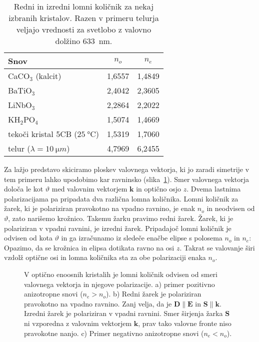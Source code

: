 \begin{table}[h]
 \centering
\begin{tabular}{|l|c|c|} \hline  
      Snov & $n_o$ & $n_e$ \\ \hline
      CaCO$_3$ (kalcit) & 1,6557 & 1,4849 \\ \hline
      BaTiO$_3$ & 2,4042 & 2,3605 \\ \hline
      LiNbO$_3$ & 2,2864 & 2,2022 \\ \hline
      KH$_2$PO$_4$ & 1,5074 & 1,4669 \\ \hline
      tekoči kristal 5CB ($25~\si{\degreeCelsius}$) & 1,5319 & 1,7060 \\ \hline
      telur ($\lambda = 10~\si{\micro m}$) & 4,7969 & 6,2455 \\
\hline 
\end{tabular}
  \caption{Redni in izredni lomni količnik za nekaj izbranih kristalov. Razen v primeru telurja
   veljajo vrednosti za svetlobo z valovno dolžino 633~nm.}
\label{table:none}
\end{table}

Za lažjo predstavo skiciramo ploskev valovnega vektorja, ki jo zaradi simetrije v tem 
primeru lahko upodobimo kar ravninsko (slika~\ref{fig:Elipsa}). 
Smer valovnega vektorja določa le kot 
$\vartheta$ med valovnim vektorjem $\mathbf{k}$ in optično osjo $z$. Dvema 
lastnima polarizacijama pa pripadata dva različna lomna količnika. 
Lomni količnik za žarek, ki je polariziran pravokotno na vpadno ravnino, 
je enak $n_o$ in neodvisen od $\vartheta$, zato narišemo krožnico. Takemu žarku pravimo redni žarek. 
Žarek, ki je polariziran v vpadni ravnini, je izredni žarek. Pripadajoč
lomni količnik je odvisen od kota $\vartheta$ in ga izračunamo iz sledeče enačbe elipse
s polosema $n_o$ in $n_e$: 
Opazimo, da se krožnica in elipsa dotikata ravno na osi $z$. Takrat se 
valovanje širi vzdolž optične osi in lomna količnika sta za obe polarizaciji enaka $n_o$. 

\begin{figure}[h]
\centering
\def\svgwidth{140truemm} 

\caption{V optično enoosnih kristalih je lomni količnik odvisen
od smeri valovnega vektorja in njegove polarizacije. a) primer pozitivno anizotropne
snovi ($n_e>n_o$). b) Redni žarek je polariziran pravokotno na vpadno ravnino. Zanj velja, 
da je $\mathbf{D} \parallel \mathbf{E}$ in $\mathbf{S} \parallel \mathbf{k}$. Izredni žarek
je polariziran v vpadni ravnini. Smer širjenja žarka $\mathbf{S}$ ni vzporedna z valovnim vektorjem
$\mathbf{k}$,
prav tako valovne fronte niso pravokotne nanjo. c) Primer negativno anizotropne snovi ($n_e< n_o$).}
\label{fig:Elipsa}
\end{figure}

